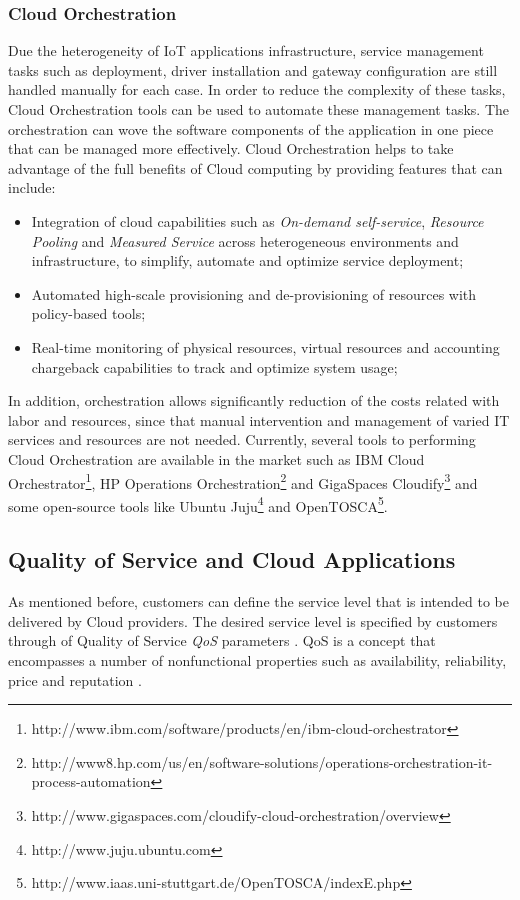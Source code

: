 \subsubsection{Cloud Orchestration}
\label{subs:cloud_orchestration}
Due the heterogeneity of IoT applications infrastructure, service management tasks
such as deployment, driver installation and gateway configuration are still handled
manually for each case. In order to reduce the complexity of these tasks, Cloud Orchestration
tools can be used to automate these management tasks. The orchestration can wove the
software components of the application in one piece that can be managed more effectively.
Cloud Orchestration helps to take advantage of the full benefits of Cloud computing by
providing features that can include:
\begin{itemize}
  \item Integration of cloud capabilities \cite{mell2011nist} such as \textit{On-demand self-service},
  \textit{Resource Pooling} and \textit{Measured Service} across heterogeneous environments and
  infrastructure, to simplify, automate and optimize service deployment;
  \item Automated high-scale provisioning and de-provisioning of resources with policy-based tools;
  \item Real-time monitoring of physical resources, virtual resources and accounting chargeback
  capabilities to track and optimize system usage;
\end{itemize}
In addition, orchestration allows significantly reduction of the costs related with labor
and resources, since that manual intervention and management of varied IT services and resources
are not needed. Currently, several tools to performing Cloud Orchestration are available
in the market such as IBM Cloud Orchestrator\footnote{http://www.ibm.com/software/products/en/ibm-cloud-orchestrator},
HP Operations Orchestration\footnote{http://www8.hp.com/us/en/software-solutions/operations-orchestration-it-process-automation}
and GigaSpaces Cloudify\footnote{http://www.gigaspaces.com/cloudify-cloud-orchestration/overview}
and some open-source tools like Ubuntu Juju\footnote{http://www.juju.ubuntu.com}
and OpenTOSCA\footnote{http://www.iaas.uni-stuttgart.de/OpenTOSCA/indexE.php}.
\subsection{Quality of Service and Cloud Applications}
\label{sub:qos_cloud}
As mentioned before, customers can define the service level that is intended to be
delivered by Cloud providers. The desired service level is specified by customers
through of Quality of Service \textit{QoS} parameters \cite{vaquero2008break}.
QoS is a concept that encompasses a number of nonfunctional properties such as
availability, reliability, price and reputation \cite{o2002s}.\\

